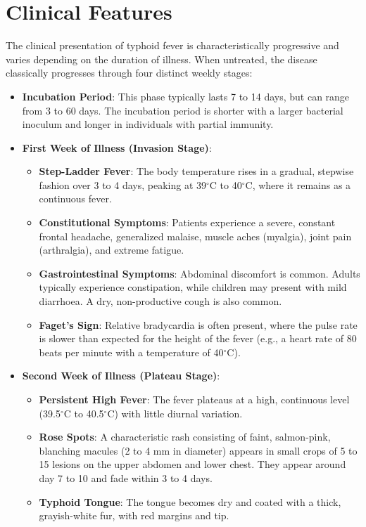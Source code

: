 \section*{Clinical Features}
The clinical presentation of typhoid fever is characteristically progressive and varies depending on the duration of illness. When untreated, the disease classically progresses through four distinct weekly stages:
\begin{itemize}
  \item \textbf{Incubation Period}: This phase typically lasts 7 to 14 days, but can range from 3 to 60 days. The incubation period is shorter with a larger bacterial inoculum and longer in individuals with partial immunity.
  \item \textbf{First Week of Illness (Invasion Stage)}:
  \begin{itemize}
    \item \textbf{Step-Ladder Fever}: The body temperature rises in a gradual, stepwise fashion over 3 to 4 days, peaking at 39$^\circ$C to 40$^\circ$C, where it remains as a continuous fever.
    \item \textbf{Constitutional Symptoms}: Patients experience a severe, constant frontal headache, generalized malaise, muscle aches (myalgia), joint pain (arthralgia), and extreme fatigue.
    \item \textbf{Gastrointestinal Symptoms}: Abdominal discomfort is common. Adults typically experience constipation, while children may present with mild diarrhoea. A dry, non-productive cough is also common.
    \item \textbf{Faget's Sign}: Relative bradycardia is often present, where the pulse rate is slower than expected for the height of the fever (e.g., a heart rate of 80 beats per minute with a temperature of 40$^\circ$C).
  \end{itemize}
  \item \textbf{Second Week of Illness (Plateau Stage)}:
  \begin{itemize}
    \item \textbf{Persistent High Fever}: The fever plateaus at a high, continuous level (39.5$^\circ$C to 40.5$^\circ$C) with little diurnal variation.
    \item \textbf{Rose Spots}: A characteristic rash consisting of faint, salmon-pink, blanching macules (2 to 4 mm in diameter) appears in small crops of 5 to 15 lesions on the upper abdomen and lower chest. They appear around day 7 to 10 and fade within 3 to 4 days.
    \item \textbf{Typhoid Tongue}: The tongue becomes dry and coated with a thick, grayish-white fur, with red margins and tip.

\end{itemize}
\end{itemize}
